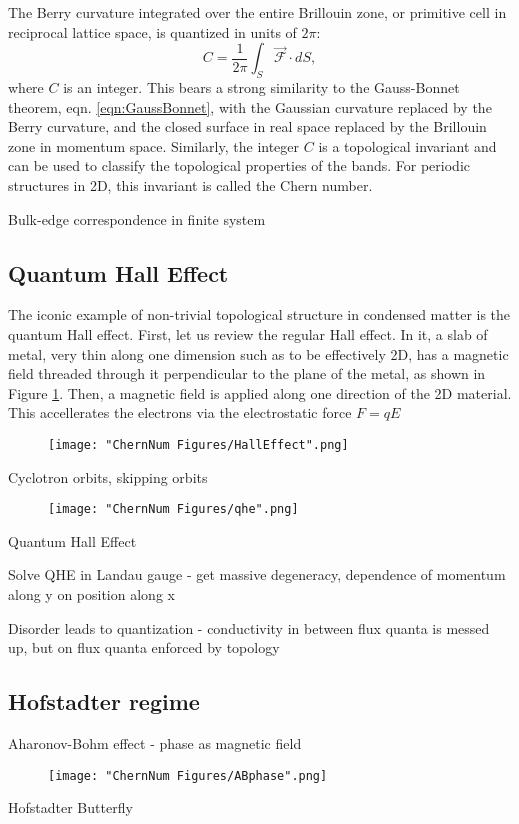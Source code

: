 The Berry curvature integrated over the entire Brillouin zone, or primitive cell in reciprocal lattice space, is quantized in units of $2\pi$:
\begin{equation}
C=\frac{1}{2\pi} \int_S \vec{\mathcal{F}}\cdot dS,
\end{equation}
where $C$ is an integer. This bears a strong similarity to the Gauss-Bonnet theorem, eqn. \ref{eqn:GaussBonnet}, with the Gaussian curvature replaced by the Berry curvature, and the closed surface in real space replaced by the Brillouin zone in momentum space. Similarly, the integer $C$ is a topological invariant and can be used to classify the topological properties of the bands. For periodic structures in 2D, this invariant is called the Chern number. 

	Bulk-edge correspondence in finite system


\subsection{Quantum Hall Effect}
The iconic example of non-trivial topological structure in condensed matter is the quantum Hall effect. First, let us review the regular Hall effect. In it, a slab of metal, very thin along one dimension such as to be effectively 2D, has a magnetic field threaded through it perpendicular to the plane of the metal, as shown in Figure \ref{fig:HallEffect}. Then, a magnetic field is applied along one direction of the 2D material. This accellerates the electrons via the electrostatic force $F=qE$ 
\begin{figure}
	\texttt{[image: "ChernNum Figures/HallEffect".png]}
\label{fig:HallEffect}
\caption{}
\end{figure}
Cyclotron orbits, skipping orbits
\begin{figure}
	\texttt{[image: "ChernNum Figures/qhe".png]}
\label{fig:qhe}
\caption{}
\end{figure}
	Quantum Hall Effect

	Solve QHE in Landau gauge - get massive degeneracy, dependence of momentum along y on position along x

	Disorder leads to quantization - conductivity in between flux quanta is messed up, but on flux quanta enforced by topology

\subsection{Hofstadter regime}
	Aharonov-Bohm effect - phase as magnetic field
\begin{figure}
	\texttt{[image: "ChernNum Figures/ABphase".png]}
\label{fig:ABphase}
\caption{}
\end{figure}
		Hofstadter Butterfly

